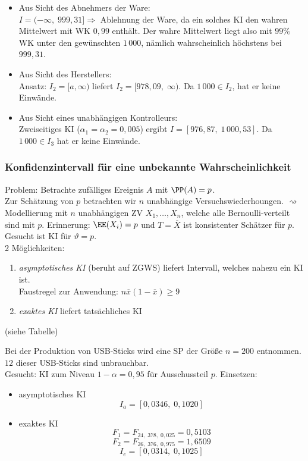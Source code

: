 \begin{itemize}
\item Aus Sicht des Abnehmers der Ware:\\
$I=(-\infty,\; 999,31] \Rightarrow$ Ablehnung der Ware, da ein solches KI den wahren Mittelwert mit WK $0,99$ enthält. Der wahre Mittelwert liegt also mit $99\%$ WK unter den gewünschten $1\,000$, nämlich wahrscheinlich höchstens bei $999,31$.
\item Aus Sicht des Herstellers:\\
Ansatz: $I_2 = [a,\infty)$ liefert $I_2=[978,09,\; \infty)$. Da $1\,000 \in I_2$, hat er keine Einwände.
\item Aus Sicht eines unabhängigen Kontrolleurs:\\
Zweiseitiges KI ($\alpha_1 = \alpha_2 = 0,005$) ergibt $I=[976,87, \; 1\,000,53]$. Da $1\,000 \in I_3$ hat er keine Einwände.
\end{itemize}

\subsubsection{Konfidenzintervall für eine unbekannte Wahrscheinlichkeit}
Problem: Betrachte zufälliges Ereignis $A$ mit $\PP(A)=p$.\\
Zur Schätzung von $p$ betrachten wir $n$ unabhängige Versuchswiederhoungen. $\rightsquigarrow$ Modellierung mit $n$ unabhängigen ZV $X_1, \ldots, X_n$, welche alle Bernoulli-verteilt sind mit $p$. Erinnerung: $\EE(X_i)=p$ und $T=\overline{X}$ ist konsistenter Schätzer für $p$.\\
Gesucht ist KI für $\vartheta = p$.\\
2 Möglichkeiten:
\begin{enumerate}
\item \emph{asymptotisches KI} (beruht auf ZGWS) liefert Intervall, welches nahezu ein KI ist.\\
Faustregel zur Anwendung: $n \overline{x}(1-\overline{x})\geq 9$
\item \emph{exaktes KI} liefert tatsächliches KI
\end{enumerate}
(siehe Tabelle)

 Bei der Produktion von USB-Sticks wird eine SP der Größe $n=200$ entnommen. $12$ dieser USB-Sticks sind unbrauchbar.\\
Gesucht: KI zum Niveau $1-\alpha = 0,95$ für Ausschussteil $p$.
Einsetzen: 
\begin{itemize}
\item asymptotisches KI
$$I_a=[0,0346, \; 0,1020]$$
\item exaktes KI
$$F_1=F_{24,\; 378,\; 0,025}=0,5103$$
$$F_2=F_{26,\; 376, \; 0,975}=1,6509$$
$$I_e=[0,0314, \; 0,1025]$$
\end{itemize}

